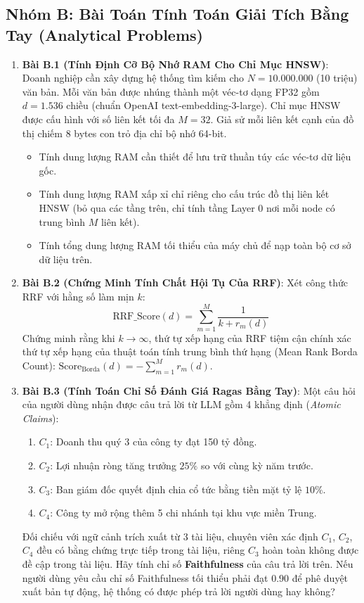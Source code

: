 \subsection{Nhóm B: Bài Toán Tính Toán Giải Tích Bằng Tay (Analytical Problems)}
\begin{enumerate}
  \item \textbf{Bài B.1 (Tính Định Cỡ Bộ Nhớ RAM Cho Chỉ Mục HNSW)}:
  Doanh nghiệp cần xây dựng hệ thống tìm kiếm cho $N = 10.000.000$ (10 triệu) văn bản.
  Mỗi văn bản được nhúng thành một véc-tơ dạng FP32 gồm $d = 1.536$ chiều (chuẩn OpenAI text-embedding-3-large).
  Chỉ mục HNSW được cấu hình với số liên kết tối đa $M = 32$.
  Giả sử mỗi liên kết cạnh của đồ thị chiếm $8$ bytes con trỏ địa chỉ bộ nhớ 64-bit.
  \begin{itemize}
    \item[a)] Tính dung lượng RAM cần thiết để lưu trữ thuần túy các véc-tơ dữ liệu gốc.
    \item[b)] Tính dung lượng RAM xấp xỉ chỉ riêng cho cấu trúc đồ thị liên kết HNSW (bỏ qua các tầng trên, chỉ tính tầng Layer 0 nơi mỗi node có trung bình $M$ liên kết).
    \item[c)] Tính tổng dung lượng RAM tối thiểu của máy chủ để nạp toàn bộ cơ sở dữ liệu trên.
  \end{itemize}

  \item \textbf{Bài B.2 (Chứng Minh Tính Chất Hội Tụ Của RRF)}:
  Xét công thức RRF với hằng số làm mịn $k$:
  \begin{equation*}
  \text{RRF\_Score}(d) = \sum_{m=1}^M \frac{1}{k + r_m(d)}
  \end{equation*}
  Chứng minh rằng khi $k \to \infty$, thứ tự xếp hạng của RRF tiệm cận chính xác thứ tự xếp hạng của thuật toán tính trung bình thứ hạng (Mean Rank Borda Count): $\text{Score}_{\text{Borda}}(d) = -\sum_{m=1}^M r_m(d)$.

  \item \textbf{Bài B.3 (Tính Toán Chỉ Số Đánh Giá Ragas Bằng Tay)}:
  Một câu hỏi của người dùng nhận được câu trả lời từ LLM gồm 4 khẳng định (\textit{Atomic Claims}):
  \begin{enumerate}
    \item $C_1$: Doanh thu quý 3 của công ty đạt 150 tỷ đồng.
    \item $C_2$: Lợi nhuận ròng tăng trưởng $25\%$ so với cùng kỳ năm trước.
    \item $C_3$: Ban giám đốc quyết định chia cổ tức bằng tiền mặt tỷ lệ $10\%$.
    \item $C_4$: Công ty mở rộng thêm 5 chi nhánh tại khu vực miền Trung.
  \end{enumerate}
  Đối chiếu với ngữ cảnh trích xuất từ 3 tài liệu, chuyên viên xác định $C_1$, $C_2$, $C_4$ đều có bằng chứng trực tiếp trong tài liệu, riêng $C_3$ hoàn toàn không được đề cập trong tài liệu.
  Hãy tính chỉ số \textbf{Faithfulness} của câu trả lời trên. Nếu người dùng yêu cầu chỉ số Faithfulness tối thiểu phải đạt $0.90$ để phê duyệt xuất bản tự động, hệ thống có được phép trả lời người dùng hay không?


\end{enumerate}
